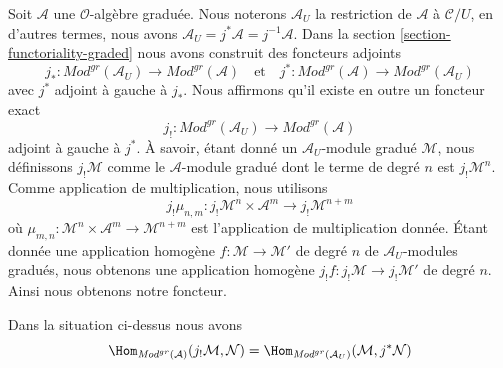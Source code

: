 \medskip\noindent
Soit $\mathcal{A}$ une $\mathcal{O}$-algèbre graduée. Nous
noterons $\mathcal{A}_U$ la restriction de $\mathcal{A}$ à
$\mathcal{C}/U$, en d'autres termes, nous avons
$\mathcal{A}_U = j^*\mathcal{A} = j^{-1}\mathcal{A}$. Dans la section
\ref{section-functoriality-graded} nous avons construit
des foncteurs adjoints
$$ j_*
:
\textit{Mod}^{gr}(\mathcal{A}_U)
\longrightarrow
\textit{Mod}^{gr}(\mathcal{A})
\quad\text{et}\quad j^*
:
\textit{Mod}^{gr}(\mathcal{A})
\longrightarrow
\textit{Mod}^{gr}(\mathcal{A}_U)
$$ avec
$j^*$ adjoint à gauche à $j_*$. Nous affirmons qu'il existe en outre un foncteur
exact
$$ j_!
:
\textit{Mod}^{gr}(\mathcal{A}_U)
\longrightarrow
\textit{Mod}^{gr}(\mathcal{A})
$$ adjoint à gauche à
$j^*$. À savoir, étant donné un $\mathcal{A}_U$-module gradué
$\mathcal{M}$, nous définissons $j_!\mathcal{M}$ comme le $\mathcal{A}$-module gradué dont le terme de degré
$n$ est $j_!\mathcal{M}^n$. Comme application de multiplication, nous
utilisons
$$
j_!\mu_{n, m} :
j_!\mathcal{M}^n \times \mathcal{A}^m \to
j_!\mathcal{M}^{n + m}
$$ où
$\mu_{m, n} : \mathcal{M}^n \times \mathcal{A}^m \to \mathcal{M}^{n + m}$ est l'application
de multiplication donnée. Étant donnée une application homogène
$f : \mathcal{M} \to \mathcal{M}'$ de degré $n$ de
$\mathcal{A}_U$-modules gradués, nous obtenons une application homogène
$j_!f : j_!\mathcal{M} \to j_!\mathcal{M}'$ de degré $n$. Ainsi
nous obtenons notre foncteur.

\begin{lemma}
\label{lemma-extension-by-zero-graded} Dans
la situation ci-dessus nous
avons $$
\Hom_{\textit{Mod}^{gr}(\mathcal{A})}(
j_!\mathcal{M}, \mathcal{N})
= \Hom_{\textit{Mod}^{gr}(\mathcal{A}_U)}(
\mathcal{M}, j^*\mathcal{N})
$$
\end{lemma}

